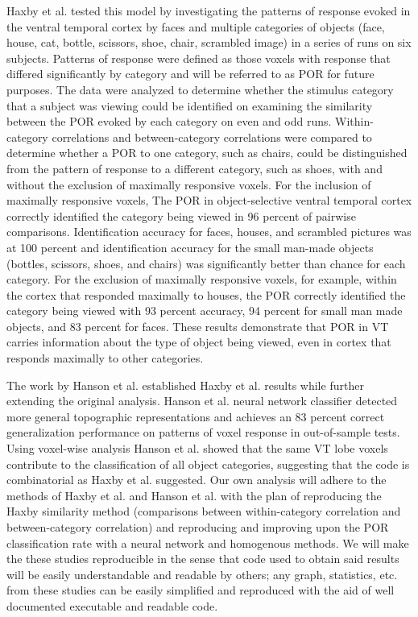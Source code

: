 \documentclass[11pt]{article}
\begin{document}
Haxby et al. tested this model by investigating the patterns of response evoked 
in the ventral temporal cortex by faces and multiple categories of objects 
(face, house, cat, bottle, scissors, shoe, chair, scrambled image) in a series 
of runs on six subjects. Patterns of response were defined as those voxels with 
response that differed significantly by category and will be referred to as POR 
for future purposes. The data \cite{haxby2001vor} were analyzed to determine 
whether the stimulus category that a subject was viewing could be identified on 
examining the similarity between the POR evoked by each category on even and 
odd runs. Within-category correlations and between-category correlations were 
compared to determine whether a POR to one category, such as chairs, could be 
distinguished from the pattern of response to a different category, such as 
shoes, with and without the exclusion of maximally responsive voxels. For the 
inclusion of maximally responsive voxels, The POR in object-selective ventral 
temporal cortex correctly identified the category being viewed in 96 percent of 
pairwise comparisons. Identification accuracy for faces, houses, and scrambled 
pictures was at 100 percent and identification accuracy for the small man-made 
objects (bottles, scissors, shoes, and chairs) was significantly better than 
chance for each category. For the exclusion of maximally responsive voxels, for 
example, within the cortex that responded maximally to houses, the POR 
correctly identified the category being viewed with 93 percent accuracy, 94 
percent for small man made objects, and 83 percent for faces.  These results 
demonstrate that POR in VT carries information about the type of object being 
viewed, even in cortex that responds maximally to other categories.

The work by Hanson et al. established Haxby et al. results while further 
extending the original analysis.  Hanson et al. neural network classifier 
detected more general topographic representations and achieves an 83 percent 
correct generalization performance on patterns of voxel response in 
out-of-sample tests.  Using voxel-wise analysis Hanson et al. showed that the 
same VT lobe voxels contribute to the classification of all object categories, 
suggesting that the code is combinatorial as Haxby et al. suggested. Our own 
analysis will adhere to the methods of Haxby et al. and Hanson et al. with the 
plan of reproducing the Haxby similarity method (comparisons between 
within-category correlation and between-category correlation) and reproducing 
and improving upon the POR classification rate with a neural network and 
homogenous methods. We will make the these studies reproducible in the sense 
that code used to obtain said results will be easily understandable and 
readable by others; any graph, statistics, etc. from these studies can be 
easily simplified and reproduced with the aid of well documented executable and 
readable code.
\end{document}
